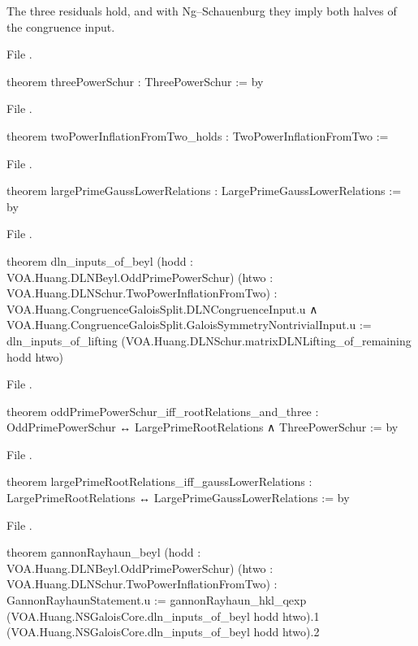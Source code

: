 \begin{theorem}\label{l21:thm:beyl}
The three residuals hold, and with Ng--Schauenburg they imply both halves of the congruence input.
\end{theorem}
\noindent File .
\begin{leancode}
theorem threePowerSchur : ThreePowerSchur := by
\end{leancode}
\noindent File .
\begin{leancode}
theorem twoPowerInflationFromTwo_holds : TwoPowerInflationFromTwo :=
\end{leancode}
\noindent File .
\begin{leancode}
theorem largePrimeGaussLowerRelations : LargePrimeGaussLowerRelations := by
\end{leancode}
\noindent File .
\begin{leancode}
theorem dln_inputs_of_beyl (hodd : VOA.Huang.DLNBeyl.OddPrimePowerSchur)
    (htwo : VOA.Huang.DLNSchur.TwoPowerInflationFromTwo) :
    VOA.Huang.CongruenceGaloisSplit.DLNCongruenceInput.{u} ∧
      VOA.Huang.CongruenceGaloisSplit.GaloisSymmetryNontrivialInput.{u} :=
  dln_inputs_of_lifting (VOA.Huang.DLNSchur.matrixDLNLifting_of_remaining hodd htwo)
\end{leancode}
\noindent File .
\begin{leancode}
theorem oddPrimePowerSchur_iff_rootRelations_and_three :
    OddPrimePowerSchur ↔ LargePrimeRootRelations ∧ ThreePowerSchur := by
\end{leancode}
\noindent File .
\begin{leancode}
theorem largePrimeRootRelations_iff_gaussLowerRelations :
    LargePrimeRootRelations ↔ LargePrimeGaussLowerRelations := by
\end{leancode}
\noindent File .
\begin{leancode}
theorem gannonRayhaun_beyl (hodd : VOA.Huang.DLNBeyl.OddPrimePowerSchur)
    (htwo : VOA.Huang.DLNSchur.TwoPowerInflationFromTwo) : GannonRayhaunStatement.{u} :=
  gannonRayhaun_hkl_qexp (VOA.Huang.NSGaloisCore.dln_inputs_of_beyl hodd htwo).1
    (VOA.Huang.NSGaloisCore.dln_inputs_of_beyl hodd htwo).2
\end{leancode}

